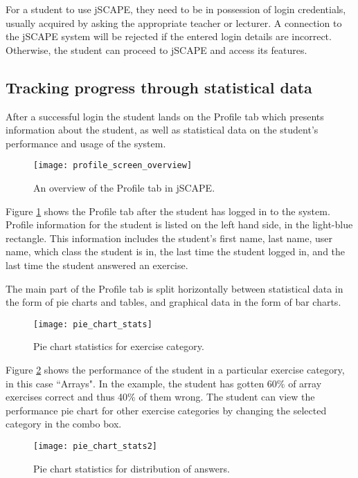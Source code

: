 For a student to use jSCAPE, they need to be in possession of login credentials, usually acquired by asking the appropriate teacher or lecturer. A connection to the jSCAPE system will be rejected if the entered login details are incorrect. Otherwise, the student can proceed to jSCAPE and access its features.

\subsection{Tracking progress through statistical data}
\label{subsec:tracking-progress}
After a successful login the student lands on the Profile tab which presents information about the student, as well as statistical data on the student's performance and usage of the system.

\begin{figure}[H]
\centering
\texttt{[image: profile\_screen\_overview]}
\caption{An overview of the Profile tab in jSCAPE.}
\label{fig:profile_screen_overview}
\end{figure}

Figure \ref{fig:profile_screen_overview} shows the Profile tab after the student has logged in to the system. Profile information for the student is listed on the left hand side, in the light-blue rectangle. This information includes the student's first name, last name, user name, which class the student is in, the last time the student logged in, and the last time the student answered an exercise. \newline

The main part of the Profile tab is split horizontally between statistical data in the form of pie charts and tables, and graphical data in the form of bar charts.

\begin{figure}[H]
\centering
\texttt{[image: pie\_chart\_stats]}
\caption{Pie chart statistics for exercise category.}
\label{fig:pie_chart_stats1}
\end{figure}

Figure \ref{fig:pie_chart_stats1} shows the performance of the student in a particular exercise category, in this case ``Arrays". In the example, the student has gotten 60\% of array exercises correct and thus 40\% of them wrong. The student can view the performance pie chart for other exercise categories by changing the selected category in the combo box.

\begin{figure}[H]
\centering
\texttt{[image: pie\_chart\_stats2]}
\caption{Pie chart statistics for distribution of answers.}
\label{fig:pie_chart_stats2}
\end{figure}

